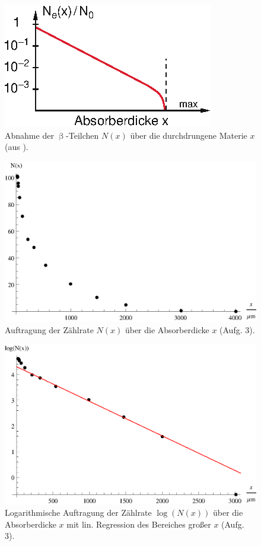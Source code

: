 \begin{figure}[tb]
	\centering
	\includegraphics[scale=1.5]{fig/ii_3_dem.eps}
	\caption{Abnahme der $\upbeta$-Teilchen $N(x)$ über die durchdrungene Materie $x$ (aus \cite[S. 92]{Dem10}).}
	\label{fig:ii_3_dem}
\end{figure}

\begin{figure}[tb]
	\centering
	\includegraphics[scale=1.0]{fig/ii_3_plota.eps}
	\caption{Auftragung der Zählrate $N(x)$ über die Absorberdicke $x$ (Aufg. 3).}
	\label{fig:ii_3_plota}
\end{figure}

\begin{figure}[tb]
	\centering
	\includegraphics[scale=1.0]{fig/ii_3_plotb.eps}
	\caption{Logarithmische Auftragung der Zählrate $\log(N(x))$ über die Absorberdicke $x$ mit lin. Regression des Bereiches großer $x$ (Aufg. 3).}
	\label{fig:ii_3_plotb}
\end{figure}

